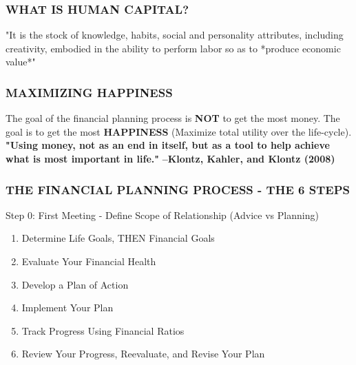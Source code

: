 \documentclass[12pt]{article}
\begin{document}
            \subsubsection{WHAT IS HUMAN CAPITAL?}
                "It is the stock of knowledge, habits, social and personality attributes, including creativity, embodied
                in the ability to perform labor so as to *produce economic value*"
            \subsubsection{MAXIMIZING HAPPINESS}
                The goal of the financial planning process is \textbf{NOT} to get the most money. The goal is to get the most
                \textbf{HAPPINESS} (Maximize total utility over the life-cycle).
                \newline
                \textbf{"Using money, not as an end in itself, but as a tool to help achieve what is most important in life."}
                \newline
                \textbf{--Klontz, Kahler, and Klontz (2008)}
            \subsubsection{THE FINANCIAL PLANNING PROCESS - THE 6 STEPS}
                Step 0: First Meeting - Define Scope of Relationship (Advice vs Planning)
                \begin{enumerate}
                    \item Determine Life Goals, THEN Financial Goals
                    \item Evaluate Your Financial Health
                    \item Develop a Plan of Action
                    \item Implement Your Plan
                    \item Track Progress Using Financial Ratios
                    \item Review Your Progress, Reevaluate, and Revise Your Plan
                \end{enumerate} 
\end{document}
